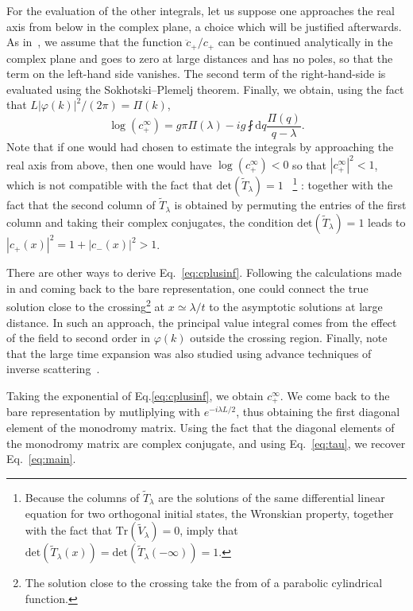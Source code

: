 \documentclass[submission,Phys,10pt]{SciPost}%
\begin{document}
For the evaluation of the other integrals, let us suppose one approaches the real axis from below in the complex plane, a choice which will be justified afterwards.
As in~\cite{wittig_landauzener_2005}, we assume that 
the function $\ddot{c}_+/c_+$ can be continued analytically  in the  complex plane and goes to zero at large distances and has no poles, so that the 
term on the left-hand side vanishes.
The second term of the right-hand-side is evaluated using the Sokhotski–Plemelj theorem. 
Finally, we obtain, using the fact that $L|\varphi(k)|^2/(2\pi)=\Pi(k)$, 
\begin{equation}
    \log (c_+^{\infty})=g \pi \Pi(\lambda) 
    -ig\fint \mathrm{d}q \frac{\Pi (q)}{q-\lambda}.
    \label{eq:cplusinf}
\end{equation}
Note that if one would had chosen to estimate the integrals by approaching the real axis from above, then one would have  $\log(c_+^\infty)<0$
so that $|c_+^\infty|^2<1$, which is not compatible with the fact that
$\mathrm{det}(\tilde{T}_\lambda)=1$ ~\cite{novikov_theory_1984}\footnote{Because the columns of $\tilde{T}_\lambda$ are the solutions of the same differential linear equation for two orthogonal initial states,  the Wronskian property, together with the fact that $\mathrm{Tr}(\tilde{V}_\lambda)=0$, imply that $\mathrm{det}(\tilde{T}_\lambda(x))=\mathrm{det}(\tilde{T}_\lambda(-\infty))=1$.} : together with the fact that the second column of $\tilde{T}_\lambda$ is obtained by permuting the entries of the first column and taking their complex conjugates, the condition $\mathrm{det}(\tilde{T}_\lambda)=1$ leads to $|c_+(x)|^2=1+|c_-(x)|^2>1$.

There are other ways to derive  Eq.~\eqref{eq:cplusinf}.  Following the calculations made in \cite{solovev_nonadiabatic_1989} and coming back to the bare representation, one could connect the true solution close to the crossing\footnote{The solution close to the crossing take the from of a parabolic cylindrical function\cite{zener_non-adiabatic_1932}.} at $x\simeq \lambda/t$ to the asymptotic solutions at large distance.
In such an approach, the principal value integral comes from the effect of the field to second order in $\varphi(k)$
outside the crossing region.
Finally, note that the large time expansion was also studied using advance techniques of inverse scattering~\cite{novikov_theory_1984,miao_interplay_2019}.

Taking the exponential of Eq.\eqref{eq:cplusinf}, we obtain $c_+^\infty$. We come back to the 
bare representation by mutliplying with $e^{-i\lambda L/2}$, thus obtaining the first diagonal element of the monodromy matrix. Using the fact that the diagonal elements of the monodromy matrix are complex conjugate, 
and using Eq.~\eqref{eq:tau}, we  
recover Eq.~\eqref{eq:main}.
\end{document}
